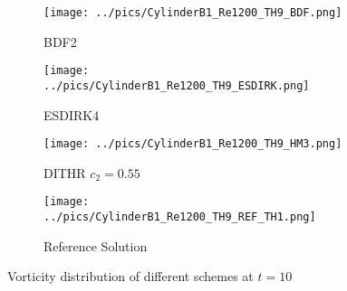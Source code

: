 \documentclass[10pt]{article}
\newcommand{\inc}{\mathrm\Delta}
\begin{document}

\begin{figure}[htbp]
  \centering
  \begin{subfigure}{0.25\textwidth}
    \texttt{[image: ../pics/CylinderB1\_Re1200\_TH9\_BDF.png]}
    \caption[]{BDF2}
    \label{sfig:Cytests_BDF}
  \end{subfigure}\hfill
  \begin{subfigure}{0.25\textwidth}
    \texttt{[image: ../pics/CylinderB1\_Re1200\_TH9\_ESDIRK.png]}
    \caption[]{ESDIRK4}
    \label{sfig:Cytests_ESDIRK}
  \end{subfigure}\hfill
  \begin{subfigure}{0.25\textwidth}
    \texttt{[image: ../pics/CylinderB1\_Re1200\_TH9\_HM3.png]}
    \caption[]{DITHR $c_2=0.55$}
    \label{sfig:Cytests_HM3}
  \end{subfigure}\hfill
  \begin{subfigure}{0.25\textwidth}
    \texttt{[image: ../pics/CylinderB1\_Re1200\_TH9\_REF\_TH1.png]}
    \caption[]{Reference Solution}
    \label{sfig:Cytests_ref}
  \end{subfigure}
  \caption[]{Vorticity distribution of different schemes at $t=10$}
  \label{fig:Cytests}
\end{figure}
\end{document}
